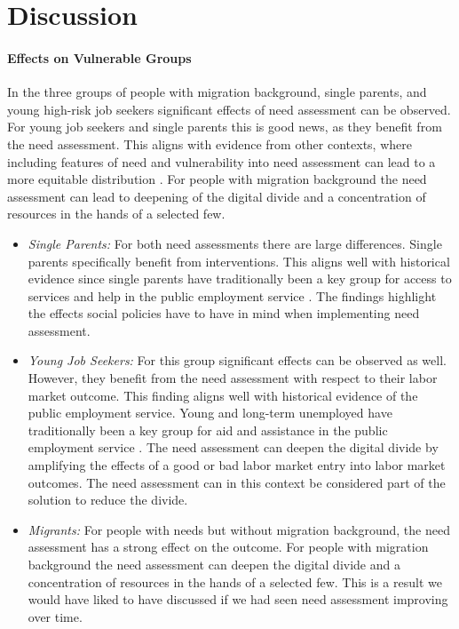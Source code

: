 \documentclass{article} %
\begin{document}
\section{Discussion}

\label{sec:discussion}

\paragraph{Effects on Vulnerable Groups}
\label{sec:discussion_groups}
In the three groups of people with migration background, single parents, and young high-risk job seekers significant effects of need assessment can be observed. For young job seekers and single parents this is good news, as they benefit from the need assessment. This aligns with evidence from other contexts, where including features of need and vulnerability into need assessment can lead to a more equitable distribution \cite{chan2012}. For people with migration background the need assessment can lead to deepening of the digital divide and a concentration of resources in the hands of a selected few.
\begin{itemize}
\item \emph{Single Parents:} For both need assessments there are large differences. Single parents specifically benefit from interventions. This aligns well with historical evidence since single parents have traditionally been a key group for access to services and help in the public employment service \cite{Kallus03042021}. The findings highlight the effects social policies have to have in mind when implementing need assessment. 
\item \emph{Young Job Seekers:} For this group significant effects can be observed as well. However, they benefit from the need assessment with respect to their labor market outcome. This finding aligns well with historical evidence of the public employment service. Young and long-term unemployed have traditionally been a key group for aid and assistance in the public employment service \cite{Kallus03042021}. The need assessment can deepen the digital divide by amplifying the effects of a good or bad labor market entry into labor market outcomes. The need assessment can in this context be considered part of the solution to reduce the divide.
\item \emph{Migrants:} For people with needs but without migration background, the need assessment has a strong effect on the outcome. For people with migration background the need assessment can deepen the digital divide and a concentration of resources in the hands of a selected few. This is a result we would have liked to have discussed if we had seen need assessment improving over time.
\end{itemize}
\end{document}
